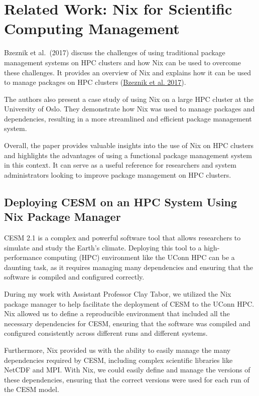 \documentclass[
]{article}
\begin{document}
\hypertarget{related-work-nix-for-scientific-computing-management}{%
\section{Related Work: Nix for Scientific Computing Management}\label{related-work-nix-for-scientific-computing-management}}

Bzeznik et al.~(2017) discuss the challenges of using traditional package management systems on HPC clusters and how Nix can be used to overcome these challenges. It provides an overview of Nix and explains how it can be used to manage packages on HPC clusters (\protect\hyperlink{ref-bzeznik2017nix}{Bzeznik et al. 2017}).

The authors also present a case study of using Nix on a large HPC cluster at the University of Oslo. They demonstrate how Nix was used to manage packages and dependencies, resulting in a more streamlined and efficient package management system.

Overall, the paper provides valuable insights into the use of Nix on HPC clusters and highlights the advantages of using a functional package management system in this context. It can serve as a useful reference for researchers and system administrators looking to improve package management on HPC clusters.

\hypertarget{deploying-cesm-on-an-hpc-system-using-nix-package-manager}{%
\subsection{Deploying CESM on an HPC System Using Nix Package Manager}\label{deploying-cesm-on-an-hpc-system-using-nix-package-manager}}

CESM 2.1 is a complex and powerful software tool that allows researchers to simulate and study the Earth's climate. Deploying this tool to a high-performance computing (HPC) environment like the UConn HPC can be a daunting task, as it requires managing many dependencies and ensuring that the software is compiled and configured correctly.

During my work with Assistant Professor Clay Tabor, we utilized the Nix package manager to help facilitate the deployment of CESM to the UConn HPC. Nix allowed us to define a reproducible environment that included all the necessary dependencies for CESM, ensuring that the software was compiled and configured consistently across different runs and different systems.

Furthermore, Nix provided us with the ability to easily manage the many dependencies required by CESM, including complex scientific libraries like NetCDF and MPI. With Nix, we could easily define and manage the versions of these dependencies, ensuring that the correct versions were used for each run of the CESM model.
\end{document}
